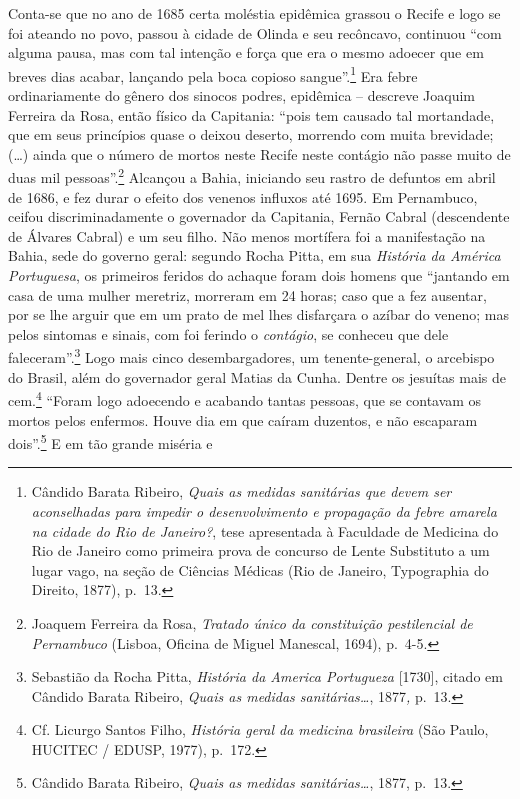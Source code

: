 Conta-se que no ano de 1685 certa moléstia epidêmica grassou o Recife e
logo se foi ateando no povo, passou à cidade de Olinda e seu recôncavo,
continuou ``com alguma pausa, mas com tal intenção e força que era o
mesmo adoecer que em breves dias acabar, lançando pela boca copioso
sangue''.\footnote{Cândido Barata Ribeiro, \emph{Quais as medidas
  sanitárias que devem ser aconselhadas para impedir o desenvolvimento e
  propagação da febre amarela na cidade do Rio de Janeiro?}, tese
  apresentada à Faculdade de Medicina do Rio de Janeiro como primeira
  prova de concurso de Lente Substituto a um lugar vago, na seção de
  Ciências Médicas (Rio de Janeiro, Typographia do Direito, 1877),
  p.~13.} Era febre ordinariamente do gênero dos sinocos podres,
epidêmica -- descreve Joaquim Ferreira da Rosa, então físico da
Capitania: ``pois tem causado tal mortandade, que em seus princípios
quase o deixou deserto, morrendo com muita brevidade; (\ldots{}) ainda
que o número de mortos neste Recife neste contágio não passe muito de
duas mil pessoas''.\footnote{Joaquem Ferreira da Rosa, \emph{Tratado
  único da constituição pestilencial de Pernambuco} (Lisboa, Oficina de
  Miguel Manescal, 1694), p.~4-5.} Alcançou a Bahia, iniciando seu
rastro de defuntos em abril de 1686, e fez durar o efeito dos venenos
influxos até 1695. Em Pernambuco, ceifou discriminadamente o governador
da Capitania, Fernão Cabral (descendente de Álvares Cabral) e um seu
filho. Não menos mortífera foi a manifestação na Bahia, sede do governo
geral: segundo Rocha Pitta, em sua \emph{História da América
Portuguesa}, os primeiros feridos do achaque foram dois homens que
``jantando em casa de uma mulher meretriz, morreram em 24 horas; caso
que a fez ausentar, por se lhe arguir que em um prato de mel lhes
disfarçara o azíbar do veneno; mas pelos sintomas e sinais, com foi
ferindo o \emph{contágio}, se conheceu que dele faleceram''.\footnote{Sebastião
  da Rocha Pitta, \emph{História da America Portugueza} {[}1730{]},
  citado em Cândido Barata Ribeiro, \emph{Quais as medidas
  sanitárias\ldots{}}, 1877\emph{,} p.~13.} Logo mais cinco
desembargadores, um tenente-general, o arcebispo do Brasil, além do
governador geral Matias da Cunha. Dentre os jesuítas mais de
cem.\footnote{Cf. Licurgo Santos Filho, \emph{História geral da medicina
  brasileira} (São Paulo, HUCITEC / EDUSP, 1977), p.~172.} ``Foram logo
adoecendo e acabando tantas pessoas, que se contavam os mortos pelos
enfermos. Houve dia em que caíram duzentos, e não escaparam
dois''.\footnote{Cândido Barata Ribeiro, \emph{Quais as medidas
  sanitárias\ldots{}}, 1877, p.~13.} E em tão grande miséria e
